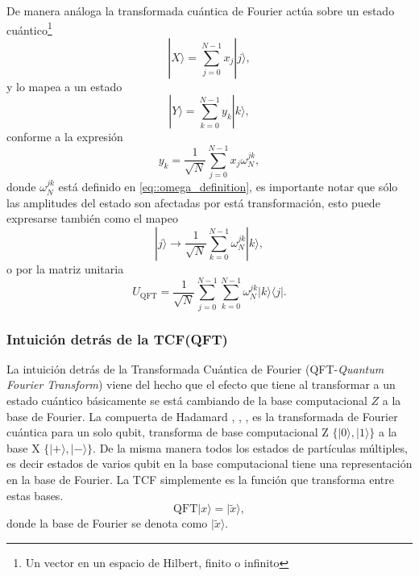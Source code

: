 \documentclass[a4paper]{article}
\begin{document}
De manera análoga la transformada cuántica de Fourier actúa sobre un estado cuántico\footnote{Un vector en un espacio de Hilbert, finito o infinito} 
\begin{equation}
|X\rangle=\sum_{j=0}^{N-1} x_{j}|j\rangle,
\end{equation}
y lo mapea a un estado 
\begin{equation}\label{eq::QFT_general}
|Y\rangle=\sum_{k=0}^{N-1} y_{k}|k\rangle,
\end{equation}
conforme a la expresión
\begin{equation}
y_k=\frac{1}{\sqrt{N}}\sum_{j=0}^{N-1}x_j\omega_{N}^{jk},
\end{equation}
donde $\omega_{N}^{jk}$ está definido en \ref{eq::omega_definition}, es importante notar que sólo las amplitudes del estado son afectadas por está transformación, esto puede expresarse también como el mapeo
\begin{equation}
|j\rangle \rightarrow \frac{1}{\sqrt{N}}\sum^{N-1}_{k=0}\omega_N^{jk}|k\rangle,
\end{equation}
o por la matriz unitaria
\begin{equation}
U_{\text{QFT}}=\frac{1}{\sqrt{N}}\sum_{j=0}^{N-1}\sum_{k=0}^{N-1}\omega_{N}^{jk}|k\rangle\langle j|.
\end{equation}
\subsubsection{Intuición detrás de la TCF(QFT)}
La intuición detrás de la Transformada Cuántica de Fourier (QFT-\textit{Quantum Fourier Transform}) viene del hecho que el efecto que tiene al transformar a un estado cuántico básicamente se está cambiando de la base computacional $Z$  a la base de Fourier. La compuerta de Hadamard \cite{Medina}, \cite{Qiskit}, \cite{Nielsen}, es la transformada de Fourier cuántica para un solo qubit, transforma de base computacional Z $\{|0\rangle, |1\rangle\}$ a la base X $\{|+\rangle, |-\rangle \}$. De la misma manera todos los estados de partículas múltiples, es decir estados de varios qubit en la base computacional tiene una representación en la base de Fourier. La TCF simplemente es la función que transforma entre estas bases.
\begin{equation}
\text{QFT}|x\rangle = |\tilde{x}\rangle ,
\end{equation}
donde la base de Fourier se denota como $|\tilde{x}\rangle$.
\end{document}
